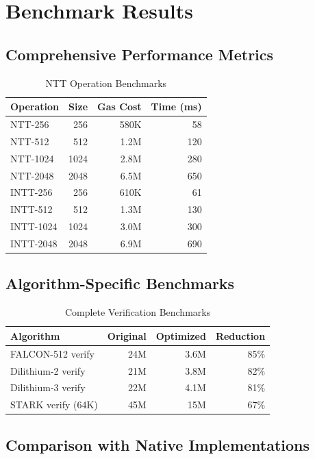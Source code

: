 \section{Benchmark Results}


\subsection{Comprehensive Performance Metrics}

\begin{table}[h]
\centering
\caption{NTT Operation Benchmarks}
\begin{tabular}{lrrr}
\toprule
Operation & Size & Gas Cost & Time (ms) \\
\midrule
NTT-256 & 256 & 580K & 58 \\
NTT-512 & 512 & 1.2M & 120 \\
NTT-1024 & 1024 & 2.8M & 280 \\
NTT-2048 & 2048 & 6.5M & 650 \\
\midrule
INTT-256 & 256 & 610K & 61 \\
INTT-512 & 512 & 1.3M & 130 \\
INTT-1024 & 1024 & 3.0M & 300 \\
INTT-2048 & 2048 & 6.9M & 690 \\
\bottomrule
\end{tabular}
\end{table}

\subsection{Algorithm-Specific Benchmarks}

\begin{table}[h]
\centering
\caption{Complete Verification Benchmarks}
\begin{tabular}{lrrr}
\toprule
Algorithm & Original & Optimized & Reduction \\
\midrule
FALCON-512 verify & 24M & 3.6M & 85\% \\
Dilithium-2 verify & 21M & 3.8M & 82\% \\
Dilithium-3 verify & 22M & 4.1M & 81\% \\
STARK verify (64K) & 45M & 15M & 67\% \\
\bottomrule
\end{tabular}
\end{table}

\subsection{Comparison with Native Implementations}

